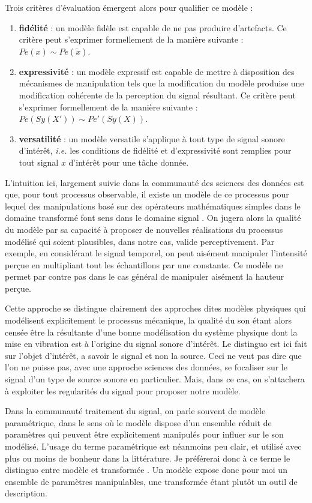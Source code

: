 Trois critères d'évaluation émergent alors pour qualifier ce modèle :
\begin{enumerate}
  \item \textbf{fidélité} : un modèle fidèle est capable de ne pas produire d'artefacts. Ce critère peut s'exprimer formellement de la manière suivante : $Pe(x) \sim Pe(\tilde{x})$.
  \item \textbf{expressivité} : un modèle expressif est capable de mettre à disposition des mécanismes de manipulation tels que la modification du modèle produise une modification cohérente de la perception du signal résultant. Ce critère peut s'exprimer formellement de la manière suivante : $Pe(Sy(X')) \sim Pe'(Sy(X))$.
  \item \textbf{versatilité} : un modèle versatile s'applique à tout type de signal sonore d'intérêt, \textit{i.e.} les conditions de fidélité et d'expressivité sont remplies pour tout signal $x$ d'intérêt pour une tâche donnée.
\end{enumerate}

L'intuition ici, largement suivie dans la communauté des sciences des données est que, pour tout processus observable, il existe un modèle de ce processus pour lequel des manipulations basé sur des opérateurs mathématiques simples dans le domaine transformé \og font sens \fg dans le domaine \fg signal \og. On jugera alors la qualité du modèle par sa capacité à proposer de nouvelles réalisations du processus modélisé qui soient plausibles, dans notre cas, valide perceptivement. Par exemple, en considérant le signal temporel, on peut aisément manipuler l'intensité perçue en multipliant tout les échantillons par une constante. Ce modèle ne permet par contre pas dans le cas général de manipuler aisément la hauteur perçue.

Cette approche se distingue clairement des approches dites \og modèles physiques \fg qui modélisent explicitement le processus mécanique, la qualité du son étant alors censée être la résultante d'une bonne modélisation du système physique dont la mise en vibration est à l'origine du signal sonore d'intérêt. Le distinguo est ici fait sur l'objet d'intérêt, a savoir le signal et non la source. Ceci ne veut pas dire que l'on ne puisse pas, avec une approche sciences des données, se focaliser sur le signal d'un type de source sonore en particulier. Mais, dans ce cas, on s'attachera à exploiter les regularités du signal pour proposer notre modèle.

Dans la communauté traitement du signal, on parle souvent de modèle paramétrique, dans le sens où le modèle dispose d'un ensemble réduit de paramètres qui peuvent être explicitement manipulés pour influer sur le son modélisé. L'usage du terme \og paramétrique \fg est néanmoins peu clair, et utilisé avec plus ou moins de bonheur dans la littérature. Je préférerai donc à ce terme le distinguo entre \og modèle \fg et \og transformée \fg. Un modèle expose donc pour moi un ensemble de paramètres manipulables, une transformée étant plutôt un outil de description.

